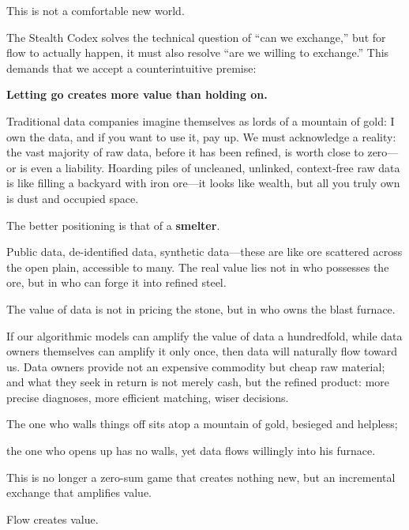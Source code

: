 This is not a comfortable new world.

The Stealth Codex solves the technical question of ``can we exchange,'' but for flow to actually happen, it must also resolve ``are we willing to exchange.'' This demands that we accept a counterintuitive premise:

\textbf{Letting go creates more value than holding on.}

\vspace{1em}

Traditional data companies imagine themselves as lords of a mountain of gold: I own the data, and if you want to use it, pay up.
We must acknowledge a reality: the vast majority of raw data, before it has been refined, is worth close to zero---or is even a liability. Hoarding piles of uncleaned, unlinked, context-free raw data is like filling a backyard with iron ore---it looks like wealth, but all you truly own is dust and occupied space.

\vspace{1em}
The better positioning is that of a \textbf{smelter}.

Public data, de-identified data, synthetic data---these are like ore scattered across the open plain, accessible to many. The real value lies not in who possesses the ore, but in who can forge it into refined steel.

\vspace{1em}

The value of data is not in pricing the stone, but in who owns the blast furnace.

If our algorithmic models can amplify the value of data a hundredfold, while data owners themselves can amplify it only once, then data will naturally flow toward us. Data owners provide not an expensive commodity but cheap raw material; and what they seek in return is not merely cash, but the refined product: more precise diagnoses, more efficient matching, wiser decisions.

\vspace{1em}

The one who walls things off sits atop a mountain of gold, besieged and helpless;

the one who opens up has no walls, yet data flows willingly into his furnace.

This is no longer a zero-sum game that creates nothing new, but an incremental exchange that amplifies value.

\begin{importantbox}
Flow creates value.
\end{importantbox}

